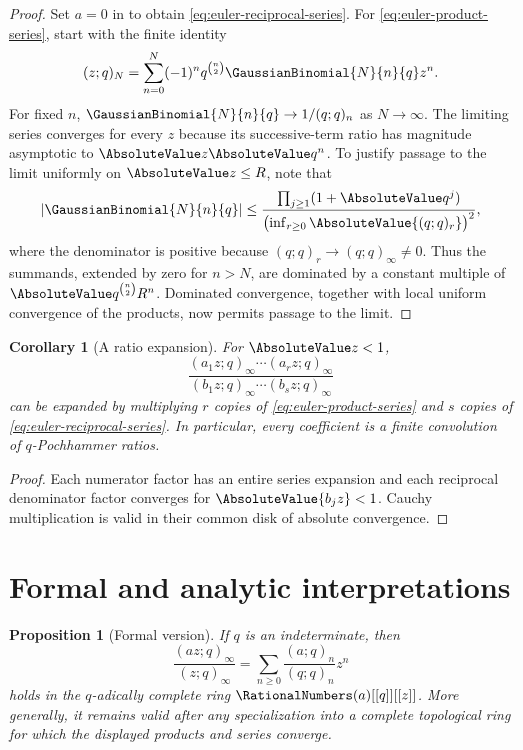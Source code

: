 \documentclass[11pt,a4paper,oneside,openany]{book}
\newtheorem{proposition}[proposition]{Proposition}
\newtheorem{corollary}[corollary]{Corollary}
\theoremstyle{definition}
\theoremstyle{remark}
\begin{document}
\begin{proof}
Set $a=0$ in  to obtain \eqref{eq:euler-reciprocal-series}.  For \eqref{eq:euler-product-series}, start with the finite identity
\[
 (z;q)_N=\sum_{n=0}^{N}(-1)^nq^{\binom n2}\GaussianBinomial{N}{n}{q} z^n.
\]
For fixed $n$, $\GaussianBinomial{N}{n}{q}\to1/(q;q)_n$ as $N\to\infty$.  The limiting series converges for every $z$ because its successive-term ratio has magnitude asymptotic to $\AbsoluteValue z\AbsoluteValue q^n$.  To justify passage to the limit uniformly on $\AbsoluteValue z\le R$, note that
\[
 \left|\GaussianBinomial{N}{n}{q}\right|
 \le
 \frac{\prod_{j\ge1}(1+\AbsoluteValue q^j)}
      {\bigl(\inf_{r\ge0}\AbsoluteValue{(q;q)_r}\bigr)^{2}},
\]
where the denominator is positive because $(q;q)_r\to(q;q)_\infty\ne0$.  Thus the summands, extended by zero for $n>N$, are dominated by a constant multiple of $\AbsoluteValue q^{\binom n2}R^n$.  Dominated convergence, together with local uniform convergence of the products, now permits passage to the limit.
\end{proof}

\begin{corollary}[A ratio expansion]\label{cor:ratio-expansion}
For $\AbsoluteValue z<1$,
\[
 \frac{(a_1z;q)_\infty\cdots(a_rz;q)_\infty}
 {(b_1z;q)_\infty\cdots(b_sz;q)_\infty}
\]
can be expanded by multiplying $r$ copies of \eqref{eq:euler-product-series} and $s$ copies of \eqref{eq:euler-reciprocal-series}.  In particular, every coefficient is a finite convolution of $q$-Pochhammer ratios.
\end{corollary}

\begin{proof}
Each numerator factor has an entire series expansion and each reciprocal denominator factor converges for $\AbsoluteValue{b_jz}<1$.  Cauchy multiplication is valid in their common disk of absolute convergence.
\end{proof}

\section{Formal and analytic interpretations}

\begin{proposition}[Formal version]\label{prop:formal-qbinomial}
If $q$ is an indeterminate, then
\[
 \frac{(az;q)_\infty}{(z;q)_\infty}
 =\sum_{n\ge0}\frac{(a;q)_n}{(q;q)_n}z^n
\]
holds in the $q$-adically complete ring $\RationalNumbers(a)[[q]][[z]]$.  More generally, it remains valid after any specialization into a complete topological ring for which the displayed products and series converge.
\end{proposition}
\end{document}
